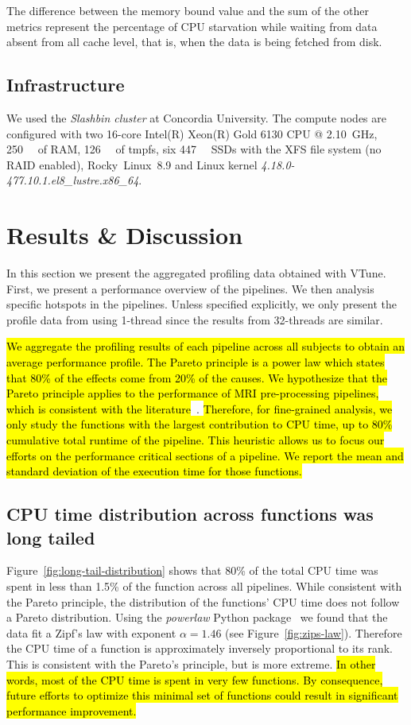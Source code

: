 \documentclass[conference]{IEEEtran}
\newcommand{\HL}[1]{\hl{#1}}
\begin{document}
The difference between the memory bound value and the sum of the other metrics represent the percentage of CPU starvation while waiting from data absent from all cache level, that is, when the data is being fetched from disk.
			
\subsection{Infrastructure}
We used the \textit{Slashbin cluster} at Concordia University. The compute nodes are configured with two 16-core Intel(R) Xeon(R) Gold 6130 CPU @ \SI{2.10}{\giga\hertz}, \SI{250}{\gibi\byte} of RAM, \SI{126}{\gibi\byte} of tmpfs, six \SI{447}{\gibi\byte} SSDs with the XFS file system (no RAID enabled), Rocky~Linux~8.9 and Linux kernel \textit{4.18.0-477.10.1.el8\_lustre.x86\_64}.
			
\section{Results \& Discussion}
In this section we present the aggregated profiling data obtained with VTune. First, we present a performance overview of the pipelines. We then analysis specific hotspots in the pipelines. Unless specified explicitly, we only present the profile data from using 1-thread since the results from 32-threads are similar.

\HL{We aggregate the profiling results of each pipeline across all subjects to obtain an average performance profile. The Pareto principle is a power law which states that 80\% of the effects come from 20\% of the causes. We hypothesize that the Pareto principle applies to the performance of MRI pre-processing pipelines, which is consistent with the literature}~\cite{Kukunas2015-jd}. \HL{Therefore, for fine-grained analysis, we only study the functions with the largest contribution to CPU time, up to 80\% cumulative total runtime of the pipeline. This heuristic allows us to focus our efforts on the performance critical sections of a pipeline. We report the mean and standard deviation of the execution time for those functions.}
			
\subsection{CPU time distribution across functions was long tailed}
Figure~\ref{fig:long-tail-distribution} shows that 80\% of the total CPU time was spent in less than 1.5\% of the function across all pipelines. While consistent with the Pareto principle, the distribution of the functions' CPU time does not follow a Pareto distribution. Using the \textit{powerlaw} Python package~\cite{Alstott2014-gr} we found that the data fit a Zipf's law with exponent $\alpha=1.46$ (see Figure~\ref{fig:zips-law}). Therefore the CPU time of a function is approximately inversely proportional to its rank. This is consistent with the Pareto's principle, but is more extreme. \HL{In other words, most of the CPU time is spent in very few functions. By consequence, future efforts to optimize this minimal set of functions could result in significant performance improvement.}
\end{document}
